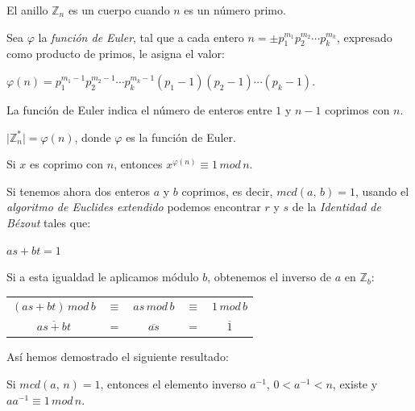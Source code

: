 \begin{theorem}
	El anillo $\mathbb{Z}_n$ es un cuerpo cuando $n$ es un número primo.
\end{theorem}

Sea $\varphi$ la \textit{función de Euler}, tal que a cada entero $n=\pm p_1^{m_1}p_2^{m_2}\cdots p_k^{m_k}$, expresado como producto de primos, le asigna el valor:

$\varphi(n)=p_1^{m_1-1} p_2^{m_2-1} \cdots p_k^{m_k-1} (p_1 -1) (p_2 -1) \cdots (p_k -1)$.

La función de Euler indica el número de enteros entre $1$ y $n-1$ coprimos con $n$.

\begin{proposition}
	$\mid \mathbb{Z}^*_n \mid = \varphi(n)$, donde $\varphi$ es la función de Euler.
\end{proposition}

\begin{theorem}[Euler]
	Si $x$ es coprimo con $n$, entonces $x^{\varphi(n)} \equiv 1 \, mod \, n$.
\end{theorem}

\hfil

Si tenemos ahora dos enteros $a$ y $b$ coprimos, es decir, $mcd(a,\,b) = 1$, usando el \textit{algoritmo de Euclides extendido} podemos encontrar $r$ y $s$ de la \textit{Identidad de Bézout} tales que:
\begin{center}
	$ as + bt = 1 $
\end{center}

Si a esta igualdad le aplicamos módulo $b$, obtenemos el inverso de $a$ en $\mathbb{Z}_b$:
\begin{center}
	\begin{tabular}{ccccc}
	$  ( as + bt ) \, mod \, b $ & $\equiv $ & $as \, mod \, b $ & $ \equiv$ & $1 \, mod \, b $ \\
	$ \overline{as+bt} $ & $=$ & $\overline{as} $ & $=$ & $\overline{1} $
\end{tabular}
\end{center}

Así hemos demostrado el siguiente resultado:

\begin{proposition}
	Si $mcd(a,\,n) = 1$, entonces el elemento inverso $a^{-1}$, $0<a^{-1}<n$, existe y $a a^{-1} \equiv 1 \, mod \, n$.
\end{proposition}


\hfil


